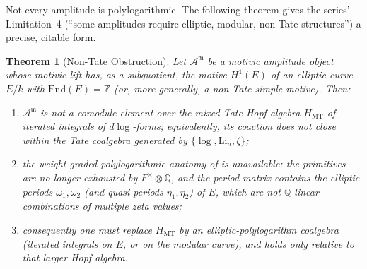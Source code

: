 \documentclass[12pt]{article}
\newtheorem{theorem}{Theorem}[section]
\theoremstyle{definition}
\theoremstyle{remark}
\newcommand{\Amm}{\mathcal{A}^{\mathfrak{m}}}
\newcommand{\Li}{\mathrm{Li}}
\newcommand{\Qbb}{\mathbb{Q}}
\newcommand{\Zbb}{\mathbb{Z}}
\begin{document}
Not every amplitude is polylogarithmic. The following theorem gives the series' Limitation~4
(``some amplitudes require elliptic, modular, non-Tate structures'') a precise, citable form.

\begin{theorem}[Non-Tate Obstruction]
\label{thm:nontate}
Let $\Amm$ be a motivic amplitude object whose motivic lift has, as a subquotient, the motive
$H^1(E)$ of an elliptic curve $E/k$ with $\mathrm{End}(E)=\Zbb$ (or, more generally, a
non-Tate simple motive). Then:
\begin{enumerate}[label=\textup{(\roman*)}, leftmargin=2.2em]
\item $\Amm$ is not a comodule element over the mixed Tate Hopf algebra $H_{\mathrm{MT}}$ of
iterated integrals of $d\log$-forms; equivalently, its coaction does not close within the
Tate coalgebra generated by $\{\log,\Li_n,\zeta\}$;
\item the weight-graded polylogarithmic anatomy of  is unavailable:
the primitives are no longer exhausted by $F^\times\otimes\Qbb$, and the period matrix
contains the elliptic periods $\omega_1,\omega_2$ (and quasi-periods $\eta_1,\eta_2$) of $E$,
which are not $\Qbb$-linear combinations of multiple zeta values;
\item consequently one must replace $H_{\mathrm{MT}}$ by an elliptic-polylogarithm coalgebra
(iterated integrals on $E$, or on the modular curve), and  holds only relative
to that larger Hopf algebra.
\end{enumerate}
\end{theorem}
\end{document}
